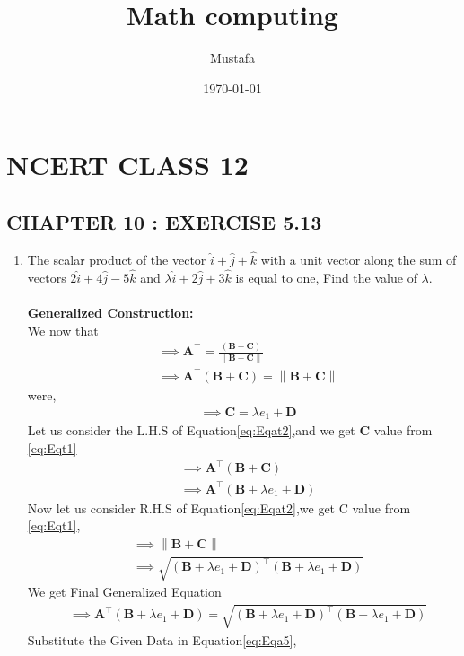 \documentclass[11pt, a4paper]{article}
\title{ Math computing}
\author{ Mustafa}
\date{\today}
\let\vec\mathbf
\providecommand{\brak}[1]{\ensuremath{\left(#1\right)}}
\providecommand{\norm}[1]{\left\lVert#1\right\rVert}
\begin{document}
\section*{NCERT CLASS 12}
\subsection*{CHAPTER 10 : EXERCISE 5.13}
\begin{enumerate}
\item\textbf{}The scalar product of the vector $\hat{i}+\hat{j}+\hat{k}$ with a unit vector along the sum of vectors $2\hat{i}+4\hat{j}-5\hat{k}$ and $\lambda\hat{i}+2\hat{j}+3\hat{k}$ is equal to one, Find the value of $\lambda$.
\\\\
\textbf{Generalized Construction:}\\
We now that \\
\begin{align}
   &\implies \vec{A}^\top = \frac{\brak{\vec{B}+\vec{C}}}{\norm{\vec{B}+\vec{C}}}\\
       &\implies \vec{A}^\top \brak{\vec{B}+\vec{C}}=\norm{\vec{B}+\vec{C}} \label{eq:Eqat2}
    \end{align}
    were,\\
    \begin{align}
        & \implies \vec{C}=\lambda e_1+\vec{D}\label{eq:Eqt1}
    \end{align}
Let us consider the L.H.S of Equation\eqref{eq:Eqat2},and we get $\vec{C}$ value from \eqref{eq:Eqt1}
\begin{align}
    &\implies \vec{A}^\top \brak{\vec{B}+\vec{C}}\\
   &\implies \vec{A}^\top \brak{\vec{B}+\lambda e_1+\vec{D}}
\end{align}
Now let us consider R.H.S of Equation\eqref{eq:Eqat2},we get C value from \eqref{eq:Eqt1},
\begin{align}
&\implies\norm{\vec{B}+\vec{C}} \\
    &\implies \sqrt{\brak{\vec{B}+\lambda e_1+\vec{D}}^\top\brak{\vec{B}+\lambda e_1+\vec{D}}}
\end{align}
We get Final Generalized Equation
\begin{align}
   &\implies \vec{A}^\top \brak{\vec{B}+\lambda e_1+\vec{D}}=\sqrt{\brak{\vec{B}+\lambda e_1+\vec{D}}^\top\brak{\vec{B}+\lambda e_1+\vec{D}}}
   \label{eq:Eqa5}
\end{align}
Substitute the Given Data in Equation\eqref{eq:Eqa5},
\begin{align*}

\end{align*}
\end{enumerate}
\end{document}
